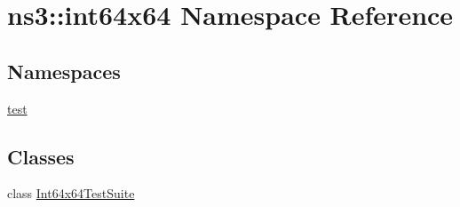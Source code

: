 \hypertarget{namespacens3_1_1int64x64}{}\section{ns3\+:\+:int64x64 Namespace Reference}
\label{namespacens3_1_1int64x64}
\subsection*{Namespaces}
\begin{DoxyCompactItemize}
\item 
 \hyperlink{namespacens3_1_1int64x64_1_1test}{test}
\end{DoxyCompactItemize}
\subsection*{Classes}
\begin{DoxyCompactItemize}
\item 
class \hyperlink{classns3_1_1int64x64_1_1Int64x64TestSuite}{Int64x64\+Test\+Suite}
\end{DoxyCompactItemize}
